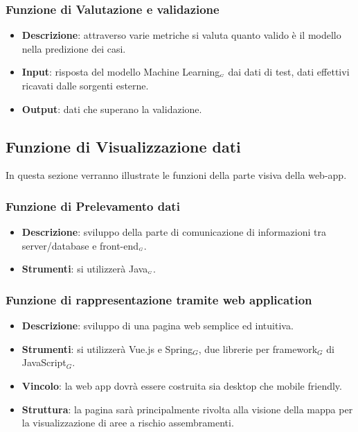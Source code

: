 \subsubsection{Funzione di Valutazione e validazione}\label{DescrizioneGeneraleFunzionalitàDelProdottoFunzioneDiElaborazioneDatiFunzioneDiValutazioneEValidazione}

\begin{itemize}
	\item \textbf{Descrizione}: attraverso varie metriche si valuta quanto valido è il modello nella predizione dei casi.
	\item \textbf{Input}: risposta del modello Machine Learning$_{\scaleto{G}{3pt}}$ dai dati di test, dati effettivi ricavati dalle sorgenti esterne.
	\item \textbf{Output}: dati che superano la validazione.
\end{itemize}

\subsection{Funzione di Visualizzazione dati}\label{DescrizioneGeneraleFunzionalitàDelProdottoFunzioneDiVisualizzazione}
In questa sezione verranno illustrate le funzioni della parte visiva della web-app.

\subsubsection{Funzione di Prelevamento dati}\label{DescrizioneGeneraleFunzionalitàDelProdottoFunzioneDiVisualizzazioneFunzioneDiPrelevamentoDati}

\begin{itemize}
	\item \textbf{Descrizione}: sviluppo della parte di comunicazione di informazioni tra server/database e front-end$_{\scaleto{G}{3pt}}$.
	\item \textbf{Strumenti}: si utilizzerà Java$_{\scaleto{G}{3pt}}$.
\end{itemize}

\subsubsection{Funzione di rappresentazione tramite web application}\label{DescrizioneGeneraleFunzionalitàDelProdottoFunzioneDiVisualizzazioneFunzioneDiRappresentazioneTramiteWebApplication}

\begin{itemize}
	\item \textbf{Descrizione}: sviluppo di una pagina web semplice ed intuitiva.
	\item \textbf{Strumenti}: si utilizzerà Vue.js e Spring$_G$, due librerie per framework$_G$ di JavaScript$_G$.
	\item \textbf{Vincolo}: la web app dovrà essere costruita sia desktop che mobile friendly.
	\item \textbf{Struttura}: la pagina sarà principalmente rivolta alla visione della mappa per la visualizzazione di aree a rischio assembramenti.
\end{itemize}


